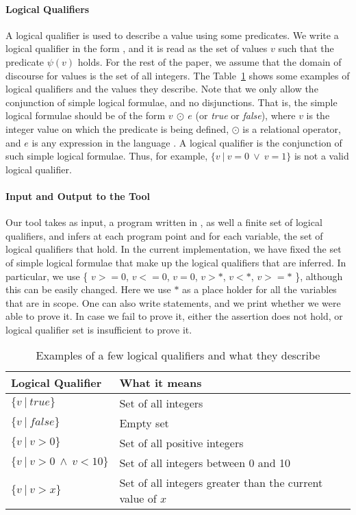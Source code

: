 \paragraph{Logical Qualifiers}
A logical qualifier is used to describe a value using some predicates.
We write a logical qualifier in the form \av{}{}, and it is read as the set of values $v$ such that the predicate $\psi(v)$ holds.
For the rest of the paper, we assume that the domain of discourse for values is the set of all integers.
The Table~\ref{tab:lqs} shows some examples of logical qualifiers and the values they describe.
Note that we only allow the conjunction of simple logical formulae, and no disjunctions.
That is, the simple logical formulae should be of the form $v\ \odot\ e$ (or \textit{true} or \textit{false}), where $v$ is the integer value on which the predicate is being defined, $\odot$ is a relational operator, and $e$ is any expression in the language \lang.
A logical qualifier is the conjunction of such simple logical formulae.
Thus, for example, $\{ v\ |\ v = 0\ \lor\ v = 1\}$ is not a valid logical qualifier.

\paragraph{Input and Output to the Tool}
Our tool takes as input, a program written in \lang, as well a finite set of logical qualifiers, and infers at each program point and for each variable, the set of logical qualifiers that hold.
In the current implementation, we have fixed the set of simple logical formulae that make up the logical qualifiers that are inferred.
In particular, we use \{ $v >= 0$, $v <= 0$, $v = 0$, $v > *$, $v < *$, $v >= *$ \}, although this can be easily changed.
Here we use $*$ as a place holder for all the variables that are in scope.
One can also write  statements, and we print whether we were able to prove it.
In case we fail to prove it, either the assertion does not hold, or logical qualifier set is insufficient to prove it.

\begin{table}
\begin{center}
    \begin{tabular}{ | l | l | }
    \hline
    \textbf{Logical Qualifier} & \textbf{What it means}  \\
    \hline
    $\{ v\ |\ \textit{true}\}$ & Set of all integers \\
    \hline
    $\{ v\ |\ \textit{false}\}$ & Empty set \\
    \hline
    $\{ v\ |\ v > 0\}$ & Set of all positive integers \\
    \hline
    $\{ v\ |\ v > 0\ \land \ v < 10 \}$ & Set of all integers between 0 and 10 \\
    \hline
    $\{ v\ |\ v > x\}$ & Set of all integers greater than the current value of $x$ \\
    \hline
    \end{tabular}
\end{center}
\caption{Examples of a few logical qualifiers and what they describe}
\label{tab:lqs}
\end{table}


